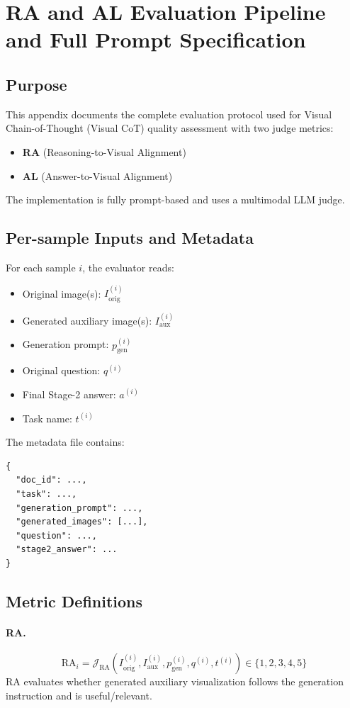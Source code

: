\documentclass{article}
\theoremstyle{plain}
\theoremstyle{definition}
\theoremstyle{remark}
\begin{document}
\section{RA and AL Evaluation Pipeline and Full Prompt Specification}
\label{app:ra-al}

\subsection{Purpose}
This appendix documents the complete evaluation protocol used for Visual Chain-of-Thought (Visual CoT) quality assessment with two judge metrics:
\begin{itemize}
\item \textbf{RA} (Reasoning-to-Visual Alignment)
\item \textbf{AL} (Answer-to-Visual Alignment)
\end{itemize}
The implementation is fully prompt-based and uses a multimodal LLM judge.

\subsection{Per-sample Inputs and Metadata}
For each sample \(i\), the evaluator reads:
\begin{itemize}
\item Original image(s): \(I_{\text{orig}}^{(i)}\)
\item Generated auxiliary image(s): \(I_{\text{aux}}^{(i)}\)
\item Generation prompt: \(p_{\text{gen}}^{(i)}\)
\item Original question: \(q^{(i)}\)
\item Final Stage-2 answer: \(a^{(i)}\)
\item Task name: \(t^{(i)}\)
\end{itemize}

The metadata file contains:
\begin{verbatim}
{
  "doc_id": ...,
  "task": ...,
  "generation_prompt": ...,
  "generated_images": [...],
  "question": ...,
  "stage2_answer": ...
}
\end{verbatim}

\subsection{Metric Definitions}
\paragraph{RA.}
\[
\mathrm{RA}_i = \mathcal{J}_{\mathrm{RA}}\!\left(I_{\text{orig}}^{(i)}, I_{\text{aux}}^{(i)},
p_{\text{gen}}^{(i)}, q^{(i)}, t^{(i)}\right)\in\{1,2,3,4,5\}
\]
RA evaluates whether generated auxiliary visualization follows the generation instruction and is useful/relevant.
\end{document}
